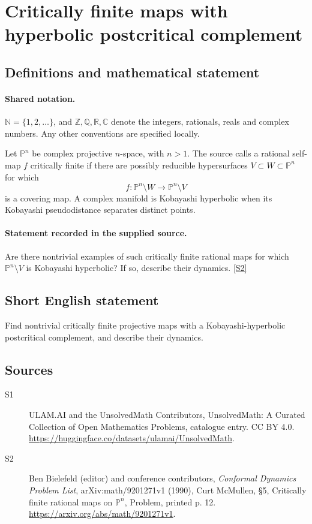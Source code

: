 \documentclass[11pt]{article}
\newcommand{\sref}[2]{\hyperlink{source:#1:#2}{[S#2]}}
\begin{document}
\section{Critically finite maps with hyperbolic postcritical complement}\label{statement}

\subsection{Definitions and mathematical statement}

\paragraph{Shared notation.}$\mathbb N=\{1,2,\ldots\}$, and $\mathbb Z,\mathbb Q,\mathbb R,\mathbb C$ denote the integers, rationals, reals and complex numbers. Any other conventions are specified locally.


Let $\mathbb P^n$ be complex projective $n$-space, with $n>1$. The source calls a rational self-map $f$ critically finite if there are possibly reducible hypersurfaces $V\subset W\subset\mathbb P^n$ for which
\[f:\mathbb P^n\setminus W\longrightarrow\mathbb P^n\setminus V\]
is a covering map. A complex manifold is Kobayashi hyperbolic when its Kobayashi pseudodistance separates distinct points.
\paragraph{Statement recorded in the supplied source.}
Are there nontrivial examples of such critically finite rational maps for which $\mathbb P^n\setminus V$ is Kobayashi hyperbolic? If so, describe their dynamics. \sref{statement}{2}
\subsection{Short English statement}
Find nontrivial critically finite projective maps with a Kobayashi-hyperbolic postcritical complement, and describe their dynamics.
\subsection{Sources}
\begin{description}
\item[\hypertarget{source:statement:1}{S1}] ULAM.AI and the UnsolvedMath Contributors, UnsolvedMath: A Curated Collection of Open Mathematics Problems, catalogue entry. CC BY 4.0. \url{https://huggingface.co/datasets/ulamai/UnsolvedMath}.
\item[\hypertarget{source:statement:2}{S2}] Ben Bielefeld (editor) and conference contributors, \emph{Conformal Dynamics Problem List}, arXiv:math/9201271v1 (1990), Curt McMullen, \S5, Critically finite rational maps on $\mathbb P^n$, Problem, printed p. 12. \url{https://arxiv.org/abs/math/9201271v1}.
\end{description}
\label{end:statement}
\end{document}
